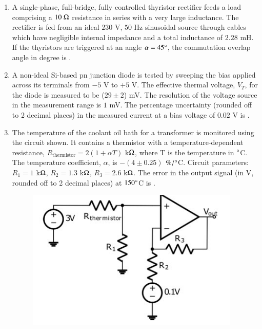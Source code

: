 \documentclass[journal,12pt,onecolumn]{IEEEtran}
\theoremstyle{remark}
\begin{document}
\begin{enumerate}[start=1, label=Q.\arabic*]
    \hfill{}

    \item A single-phase, full-bridge, fully controlled thyristor rectifier feeds a load comprising a $10~\ohm$ resistance in series with a very large inductance. The rectifier is fed from an ideal $230$ V, $50$ Hz sinusoidal source through cables which have negligible internal impedance and a total inductance of $2.28$ mH. If the thyristors are triggered at an angle $\alpha = 45\degree$, the commutation overlap angle in degree  is \underline{\hspace{2cm}}.

    \hfill{}

    \item A non-ideal Si-based pn junction diode is tested by sweeping the bias applied across its terminals from $-5$ V to $+5$ V. The effective thermal voltage, $V_T$, for the diode is measured to be ($29 \pm 2$) mV. The resolution of the voltage source in the measurement range is $1$ mV. The percentage uncertainty (rounded off to 2 decimal places) in the measured current at a bias voltage of $0.02$ V is \underline{\hspace{2cm}}.

    \hfill{}


\item The temperature of the coolant oil bath for a transformer is monitored using the circuit shown. It contains a thermistor with a temperature-dependent resistance, $R_{\text{thermistor}} = 2(1+\alpha T)$ k$\ohm$, where T is the temperature in $\degree$C. The temperature coefficient, $\alpha$, is $-(4 \pm 0.25)$ $\%/\degree$C. Circuit parameters: $R_1 = 1$ k$\ohm$, $R_2 = 1.3$ k$\ohm$, $R_3 = 2.6$ k$\ohm$. The error in the output signal (in V, rounded off to 2 decimal places) at $150\degree$C is \underline{\hspace{2cm}}.
    \begin{figure}[H]
        \centering
        \includegraphics[width=0.6\columnwidth]{Figures/qs66.png}
        \caption{}
    \end{figure}


\end{enumerate}
\end{document}
